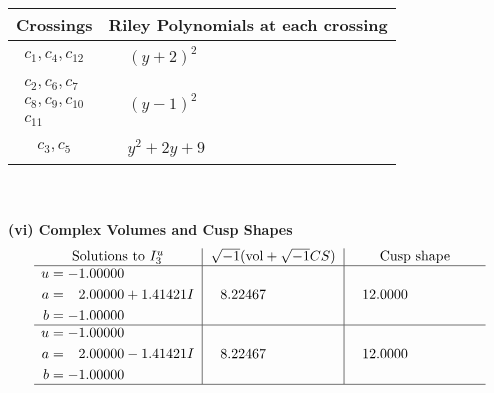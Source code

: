 \documentclass[1p]{elsarticle_modified}
\theoremstyle{definition}
\newcommand{\I}{\sqrt{-1}}
\begin{document}
\begin{tabular}{m{50pt}|m{274pt}}
Crossings & \hspace{64pt}Riley Polynomials at each crossing \\
\hline $$\begin{aligned}c_{1},c_{4},c_{12}\end{aligned}$$&$\begin{aligned}
&(y+2)^2
\end{aligned}$\\
\hline $$\begin{aligned}c_{2},c_{6},c_{7}\\c_{8},c_{9},c_{10}\\c_{11}\end{aligned}$$&$\begin{aligned}
&(y-1)^2
\end{aligned}$\\
\hline $$\begin{aligned}c_{3},c_{5}\end{aligned}$$&$\begin{aligned}
&y^2+2 y+9
\end{aligned}$\\
\hline
\end{tabular}\\~\\
\newpage\flushleft \textbf{(vi) Complex Volumes and Cusp Shapes}
$$\begin{array}{c|c|c}  
\text{Solutions to }I^u_{3}& \I (\text{vol} + \sqrt{-1}CS) & \text{Cusp shape}\\
 \hline 
\begin{aligned}
u &= -1.00000\phantom{ +0.000000I} \\
a &= \phantom{-}2.00000 + 1.41421 I \\
b &= -1.00000\phantom{ +0.000000I}\end{aligned}
 & \phantom{-}8.22467\phantom{ +0.000000I} & \phantom{-}12.0000\phantom{ +0.000000I} \\ \hline\begin{aligned}
u &= -1.00000\phantom{ +0.000000I} \\
a &= \phantom{-}2.00000 - 1.41421 I \\
b &= -1.00000\phantom{ +0.000000I}\end{aligned}
 & \phantom{-}8.22467\phantom{ +0.000000I} & \phantom{-}12.0000\phantom{ +0.000000I}\\
 \hline 
 \end{array}$$\newpage\newpage\renewcommand{\arraystretch}{1}
\end{document}
